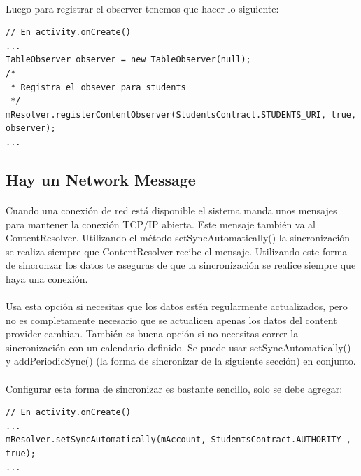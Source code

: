 \documentclass[10pt]{extarticle}
\begin{document}
\paragraph{}
Luego para registrar el observer tenemos que hacer lo siguiente:

\begin{lstlisting}
// En activity.onCreate()
...
TableObserver observer = new TableObserver(null);
/*
 * Registra el obsever para students
 */
mResolver.registerContentObserver(StudentsContract.STUDENTS_URI, true, observer);
...

\end{lstlisting}

\subsection{Hay un Network Message}

\paragraph{}
Cuando una conexión de red está disponible el sistema manda unos mensajes para mantener la conexión TCP/IP abierta. Este mensaje también va al ContentResolver. Utilizando el método setSyncAutomatically() la sincronización se realiza siempre que ContentResolver recibe el mensaje. Utilizando este forma de sincronzar los datos te aseguras de que la sincronización se realice siempre que haya una conexión.

\paragraph{}
Usa esta opción si necesitas que los datos estén regularmente actualizados, pero no es completamente necesario que se actualicen apenas los datos del content provider cambian. También es buena opción si no necesitas correr la sincronización con un calendario definido. Se puede usar setSyncAutomatically() y  addPeriodicSync() (la forma de sincronizar de la siguiente sección) en conjunto.

\paragraph{}
Configurar esta forma de sincronizar es bastante sencillo, solo se debe agregar:
\begin{lstlisting}
// En activity.onCreate()
...
mResolver.setSyncAutomatically(mAccount, StudentsContract.AUTHORITY , true);
...
\end{lstlisting}
\end{document}
